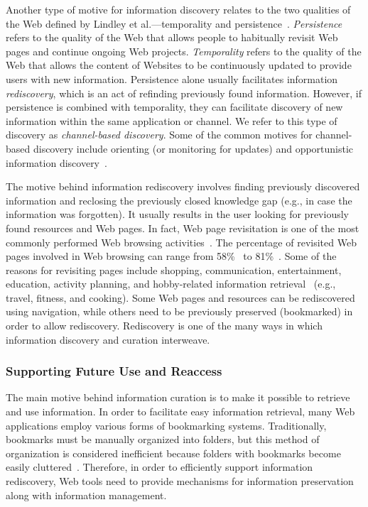 \documentclass{sigchi}
\begin{document}
{{Another type of motive for information discovery relates to the two qualities of the Web defined by Lindley et al.---temporality and persistence~\cite{lindley2012s}. \textit{Persistence} refers to the quality of the Web that allows people to habitually revisit Web pages and continue ongoing Web projects. \textit{Temporality} refers to the quality of the Web that allows the content of Websites to be continuously updated to provide users with new information. Persistence alone usually facilitates information \textit{rediscovery}, which is an act of refinding previously found information. However, if persistence is combined with temporality, they can facilitate discovery of new information within the same application or channel. We refer to this type of discovery as \textit{channel-based discovery}. Some of the common motives for channel-based discovery include orienting (or monitoring for updates) and opportunistic information discovery~\cite{lindley2012s}.          

The motive behind information rediscovery involves finding previously discovered information and reclosing the previously closed knowledge gap (e.g., in case the information was forgotten). It usually results in the user looking for previously found resources and Web pages. In fact, Web page revisitation is one of the most commonly performed Web browsing activities~\cite{adar2008large,cockburn2003improving}. The percentage of revisited Web pages involved in Web browsing can range from 58\%~\cite{tauscher1997people} to 81\%~\cite{cockburn2001web}. Some of the reasons for revisiting pages include shopping, communication, entertainment, education, activity planning, and hobby-related information retrieval~\cite{adar2008large} (e.g., travel, fitness, and cooking). Some Web pages and resources can be rediscovered using navigation, while others need to be previously preserved (bookmarked) in order to allow rediscovery. Rediscovery is one of the many ways in which information discovery and curation interweave. 
}

{\subsubsection{Supporting Future Use and Reaccess}
The main motive behind information curation is to make it possible to retrieve and use information. In order to facilitate easy information retrieval, many Web applications employ various forms of bookmarking systems. Traditionally, bookmarks must be manually organized into folders, but this method of organization is considered inefficient because folders with bookmarks become easily cluttered~\cite{abrams1998information}. Therefore, in order to efficiently support information rediscovery, Web tools need to provide mechanisms for information preservation along with information management.
}

}
\end{document}
